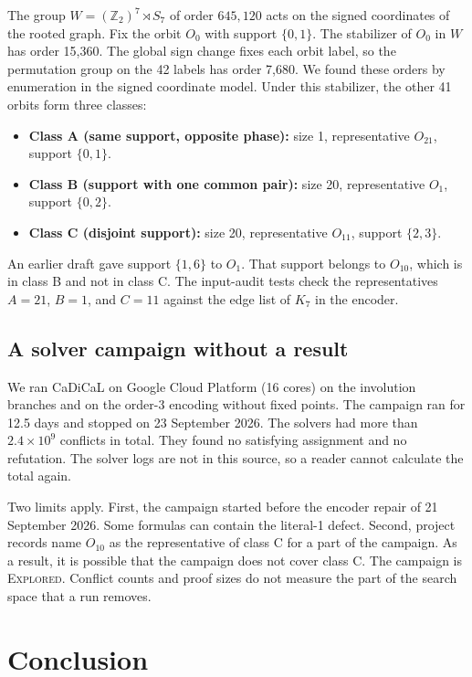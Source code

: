 \documentclass{article}
\theoremstyle{plain}
\theoremstyle{definition}
\numberwithin{equation}{section}
\begin{document}
The group $W = (\mathbb{Z}_2)^7 \rtimes S_7$ of order $645{,}120$ acts on the signed coordinates of the rooted graph. Fix the orbit $O_0$ with support $\{0, 1\}$. The stabilizer of $O_0$ in $W$ has order 15{,}360. The global sign change fixes each orbit label, so the permutation group on the 42 labels has order 7{,}680. We found these orders by enumeration in the signed coordinate model. Under this stabilizer, the other 41 orbits form three classes:
\begin{itemize}
 \item \textbf{Class A (same support, opposite phase):} size 1, representative $O_{21}$, support $\{0, 1\}$.
 \item \textbf{Class B (support with one common pair):} size 20, representative $O_1$, support $\{0, 2\}$.
 \item \textbf{Class C (disjoint support):} size 20, representative $O_{11}$, support $\{2, 3\}$.
\end{itemize}
An earlier draft gave support $\{1, 6\}$ to $O_1$. That support belongs to $O_{10}$, which is in class B and not in class C. The input-audit tests check the representatives $A=21$, $B=1$, and $C=11$ against the edge list of $K_7$ in the encoder.

\subsection{A solver campaign without a result}

We ran CaDiCaL on Google Cloud Platform (16 cores) on the involution branches and on the order-3 encoding without fixed points. The campaign ran for 12.5 days and stopped on 23 September 2026. The solvers had more than $2.4 \times 10^9$ conflicts in total. They found no satisfying assignment and no refutation. The solver logs are not in this source, so a reader cannot calculate the total again.

Two limits apply. First, the campaign started before the encoder repair of 21 September 2026. Some formulas can contain the literal-1 defect. Second, project records name $O_{10}$ as the representative of class C for a part of the campaign. As a result, it is possible that the campaign does not cover class C.
The campaign is \textsc{Explored}. Conflict counts and proof sizes do not measure the part of the search space that a run removes.

\section{Conclusion}
\end{document}
